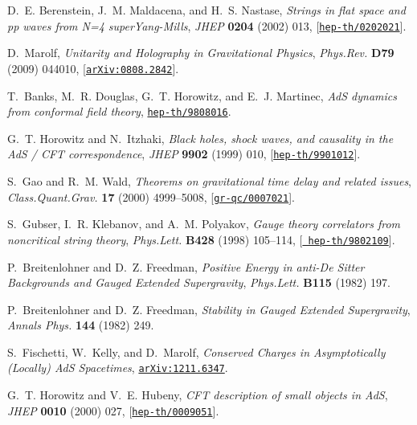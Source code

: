 \documentclass[12pt]{article}
\begin{document}
\begin{thebibliography}{100}
D.~E. Berenstein, J.~M. Maldacena, and H.~S. Nastase, {\it {Strings in flat
  space and pp waves from N=4 superYang-Mills}},  {\em JHEP} {\bf 0204} (2002)
  013, [\href{http://xxx.lanl.gov/abs/hep-th/0202021}{{\tt hep-th/0202021}}].

D.~Marolf, {\it {Unitarity and Holography in Gravitational Physics}},  {\em
  Phys.Rev.} {\bf D79} (2009) 044010,
  [\href{http://xxx.lanl.gov/abs/0808.2842}{{\tt arXiv:0808.2842}}].

T.~Banks, M.~R. Douglas, G.~T. Horowitz, and E.~J. Martinec, {\it {AdS dynamics
  from conformal field theory}},
  \href{http://xxx.lanl.gov/abs/hep-th/9808016}{{\tt hep-th/9808016}}.

G.~T. Horowitz and N.~Itzhaki, {\it {Black holes, shock waves, and causality in
  the AdS / CFT correspondence}},  {\em JHEP} {\bf 9902} (1999) 010,
  [\href{http://xxx.lanl.gov/abs/hep-th/9901012}{{\tt hep-th/9901012}}].

S.~Gao and R.~M. Wald, {\it {Theorems on gravitational time delay and related
  issues}},  {\em Class.Quant.Grav.} {\bf 17} (2000) 4999--5008,
  [\href{http://xxx.lanl.gov/abs/gr-qc/0007021}{{\tt gr-qc/0007021}}].

S.~Gubser, I.~R. Klebanov, and A.~M. Polyakov, {\it {Gauge theory correlators
  from noncritical string theory}},  {\em Phys.Lett.} {\bf B428} (1998)
  105--114, [\href{http://xxx.lanl.gov/abs/hep-th/9802109}{{\tt
  hep-th/9802109}}].

P.~Breitenlohner and D.~Z. Freedman, {\it {Positive Energy in anti-De Sitter
  Backgrounds and Gauged Extended Supergravity}},  {\em Phys.Lett.} {\bf B115}
  (1982) 197.

P.~Breitenlohner and D.~Z. Freedman, {\it {Stability in Gauged Extended
  Supergravity}},  {\em Annals Phys.} {\bf 144} (1982) 249.

S.~Fischetti, W.~Kelly, and D.~Marolf, {\it {Conserved Charges in
  Asymptotically (Locally) AdS Spacetimes}},
  \href{http://xxx.lanl.gov/abs/1211.6347}{{\tt arXiv:1211.6347}}.

G.~T. Horowitz and V.~E. Hubeny, {\it {CFT description of small objects in
  AdS}},  {\em JHEP} {\bf 0010} (2000) 027,
  [\href{http://xxx.lanl.gov/abs/hep-th/0009051}{{\tt hep-th/0009051}}].


\end{thebibliography}
\end{document}
